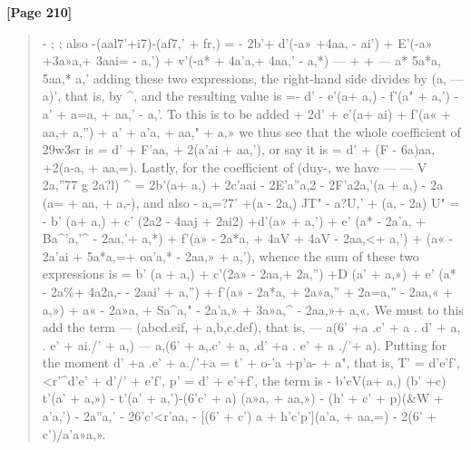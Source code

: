 \documentclass[11pt,a4paper]{book}
\begin{document}
\textbf{[Page 210]}\\[0.2cm]
\begin{quote}
-
; ;
also
-(aal7'+i7)-(af7,' + fr,) =
- 2b'+ d'(-a» +4aa, - ai') + E'(-a» +3a»a,+ 3aai= - a,') + v'(-a* + 4a'a,+ 4aa,' - a,*)
--- + + ---
a* 5a*a, 5aa,* a,'
adding these two expressions, the right-hand side divides by (a, --- a)', that is, by \textasciicircum{}, and
the resulting value is
=-
d'
- e'(a+
a,)
-
f'(a"
+
a,')
-
a'
+
a=a,
+
aa,'
-
a,'.
To this is to be added
+ 2d' + e'(a+ ai) + f'(a« + aa,+ a,'') + a' + a'a, + aa," + a,»
we thus see that the whole coefficient of 29w3sr is
= d' + F'aa, + 2(a'ai + aa,'),
or say it is
= d' + (F - 6a)aa, +2(a-a, + aa,=).
Lastly, for the coefficient of (duy-, we have
--- --- V
2a,''77 g 2a?l) \textasciicircum{} = 2b'(a+ a,) + 2c'aai - 2E'a''a,2 - 2F'a2a,'(a + a,) - 2a (a= + aa, + a,-),
and also
- a,=?7' +(a - 2a,) JT" - a?U,' + (a, - 2a) U" =
- b' (a+ a,) + c' (2a2 - 4aaj + 2ai2) +d'(a» + a,') + e' (a* - 2a'a, + Ba\textasciicircum{}'a,'\textasciicircum{} - 2aa,'+ a,*)
+ f'(a» - 2a*a, + 4aV + 4aV - 2aa,<+ a,') + (a« - 2a'ai + 5a*a,=+ oa'a,* - 2aa,» + a,'),
whence the sum of these two expressions is
= b' (a + a,) + c'(2a» - 2aa,+ 2a,'') +D (a' + a,») + e' (a* - 2a\%+ 4a2a,- - 2aai' + a,'')
+ f'(a» - 2a*a, + 2a»a,'' + 2a=a,'' - 2aa,« + a,») + a« - 2a»a, + Sa\textasciicircum{}a," - 2a'a,» + 3a»a,\textasciicircum{} - 2aa,»+ a,«.
We must to this add the term --- (abcd.eif, + a,b,c,def), that is,
--- a(6' +a .c' + a . d' + a, . e' + ai./' + a,) --- a,(6' + a,.c' + a, .d' +a . e' + a ./'+ a).
Putting for the moment
d' +a .e' + a./'+a = t' + o-'a +p'a- + a",
that is,
T' = d'e'f', <r'\textasciicircum{}d'e' + d'/' + e'f', p' = d' + e'+f',
the term is
- b'cV(a+ a,) (b' +c) t'(a' + a,») - t'(a' + a,')-(6'c' + a) (a»a, + aa,»)
-
(h'
+
c'
+ p)(\&W +
a'a,')
-
2a''a,'
- 26'c'<r'aa, - [(6' + c') a + h'c'p'](a'a, + aa,=) - 2(6' + c')/a'a»a,».
\end{quote}
\end{document}
